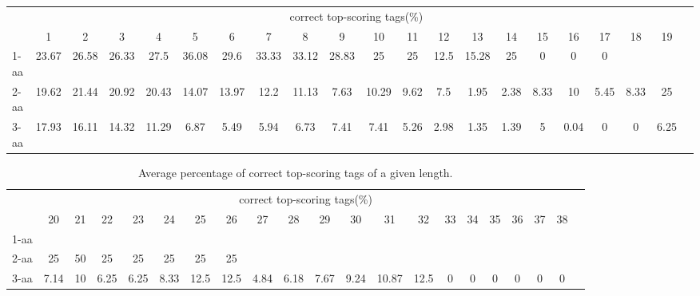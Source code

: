 \documentclass{article}[12pt]
\begin{document}
\begin{landscape}

\begin{table}[h]\tiny
\vspace{3mm}
{\centering
\begin{center}
\begin{tabular}{|l|c|c|c|c|c|c|c|c|c|c|c|c|c|c|c|c|c|c|c|c|}
  \hline
  & \multicolumn{ 19 }{|c|}{correct top-scoring tags(\%)} \\
  \cline{2- 20}
    & 1 & 2 & 3 & 4 & 5 & 6 & 7 & 8 & 9 & 10 & 11 & 12 & 13 & 14 & 15 & 16 & 17 & 18 & 19\\
  \hline
1-aa  & 23.67 & 26.58 & 26.33 & 27.5 & 36.08 & 29.6 & 33.33 & 33.12 & 28.83 & 25 & 25 & 12.5 & 15.28 & 25 & 0 & 0 & 0 &  & \\
2-aa  & 19.62 & 21.44 & 20.92 & 20.43 & 14.07 & 13.97 & 12.2 & 11.13 & 7.63 & 10.29 & 9.62 & 7.5 & 1.95 & 2.38 & 8.33 & 10 & 5.45 & 8.33 & 25\\
3-aa  & 17.93 & 16.11 & 14.32 & 11.29 & 6.87 & 5.49 & 5.94 & 6.73 & 7.41 & 7.41 & 5.26 & 2.98 & 1.35 & 1.39 & 5 & 0.04 & 0 & 0 & 6.25\\
 \hline
\end{tabular}
\end{center}
\par}
\centering

\vspace{3mm}
\end{table}
\begin{table}[h]\tiny
\vspace{3mm}
{\centering
\begin{center}
\begin{tabular}{|l|c|c|c|c|c|c|c|c|c|c|c|c|c|c|c|c|c|c|c|c|}
  \hline
  & \multicolumn{ 19 }{|c|}{correct top-scoring tags(\%)} \\
  \cline{2- 20}
    & 20 & 21 & 22 & 23 & 24 & 25 & 26 & 27 & 28 & 29 & 30 & 31 & 32 & 33 & 34 & 35 & 36 & 37 & 38\\
  \hline
1-aa  &  &  &  &  &  &  &  &  &  &  &  &  &  &  &  &  &  &  & \\
2-aa  & 25 & 50 & 25 & 25 & 25 & 25 & 25 &  &  &  &  &  &  &  &  &  &  &  & \\
3-aa  & 7.14 & 10 & 6.25 & 6.25 & 8.33 & 12.5 & 12.5 & 4.84 & 6.18 & 7.67 & 9.24 & 10.87 & 12.5 & 0 & 0 & 0 & 0 & 0 & 0\\
 \hline
\end{tabular}
\end{center}
\par}
\centering

\caption{ Average percentage of correct top-scoring tags of a given length.}
\label{table:avg-top-scoring}

\vspace{3mm}
\end{table}
\end{landscape}
\end{document}
